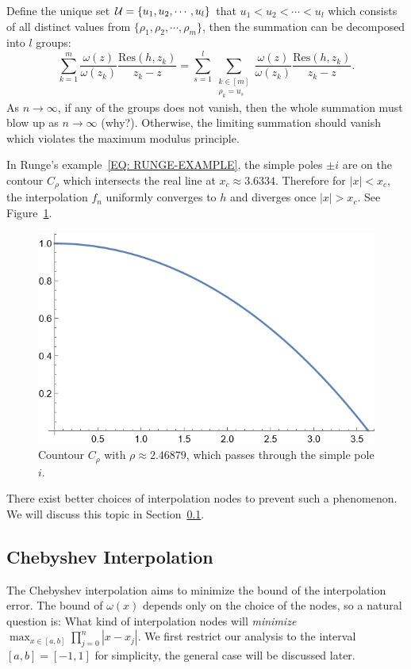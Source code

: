 Define the unique set $\mathcal U = \{u_1, u_2,\cdots, u_l\}$ that $u_1 < u_2<\cdots < u_l$ which consists of all distinct values from $\{ \rho_1, \rho_2, \cdots,  \rho_m\}$, then the summation can be decomposed into $l$ groups:
\begin{equation}
 \sum_{k=1}^m \frac{\omega(z)}{\omega(z_k)}\frac{\mathrm{Res}(h, z_k)}{z_k - z} = \sum_{s=1}^l \sum_{\substack{k\in [m] \\ \rho_k = u_s}} \frac{\omega(z)}{\omega(z_k)}\frac{\mathrm{Res}(h, z_k)}{z_k - z}.
\end{equation}
As $n\to\infty$, if any of the groups does not vanish, then the whole summation must blow up as $n\to\infty$ (why?). Otherwise, the limiting summation should vanish which violates the maximum modulus principle. 

In Runge's example~\eqref{EQ: RUNGE-EXAMPLE}, the simple poles $\pm i$ are on the contour $C_{\rho}$ which intersects the real line at $x_c\approx 3.6334$. Therefore for $|x| < x_c$, the interpolation $f_n$ uniformly converges to $h$ and diverges once $|x| > x_c$. See Figure~\ref{fig:contour-curve}.
\begin{figure}[!htb]
    \centering
    \includegraphics[scale=0.65]{Figures/contour-curve.png}
    \caption{Countour $C_{\rho}$ with $\rho \approx 2.46879$, which passes through the simple pole $i$.}
    \label{fig:contour-curve}
\end{figure}
There exist better choices of interpolation nodes to prevent such a phenomenon. We will discuss this topic in Section~\ref{Sec: 2-Che-Int}. 

\subsection{Chebyshev Interpolation}
\label{Sec: 2-Che-Int}
The Chebyshev interpolation aims to minimize the bound of the interpolation error. The bound of $\omega(x)$ depends only on the choice of the nodes, so a natural question is: What kind of interpolation nodes will \emph{minimize} 
$\max_{x\in [a, b]} \prod_{j=0}^n |x-x_j|$. We first restrict our analysis to the interval $[a, b] = [-1,1]$ for simplicity, the general case will be discussed later.
 
